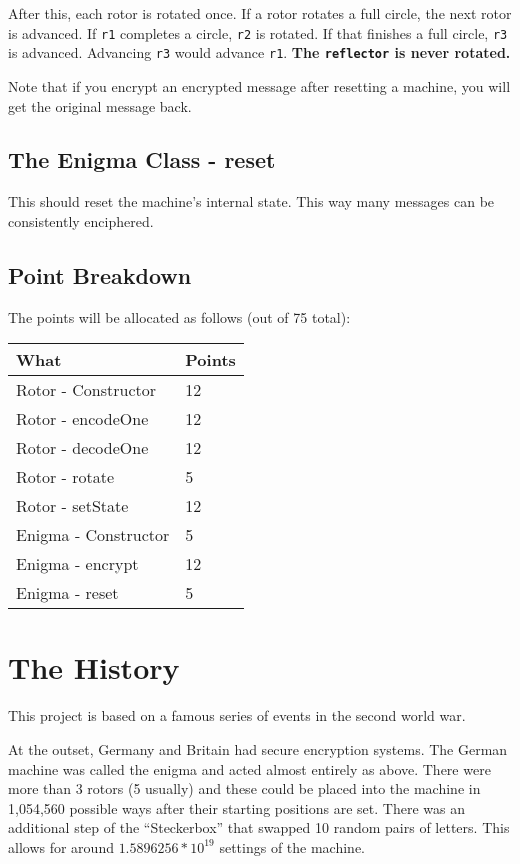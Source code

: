 \documentclass[11pt]{article}
\begin{document}
After this, each rotor is rotated once. If a rotor rotates a full circle, the next rotor is advanced.
If \texttt{r1} completes a circle, \texttt{r2} is rotated. If that finishes a full circle, \texttt{r3} is advanced. Advancing \texttt{r3} would advance \texttt{r1}. \textbf{The \texttt{reflector} is never rotated.}

Note that if you encrypt an encrypted message after resetting a machine, you will get the original message back.

\subsection{The Enigma Class - reset}
This should reset the machine's internal state. This way many messages can be consistently enciphered.

\subsection{Point Breakdown}
The points will be allocated as follows (out of 75 total):
\begin{tabular}{l | l}
  What & Points \\ \hline
  Rotor - Constructor & 12 \\
  Rotor - encodeOne & 12 \\
  Rotor - decodeOne & 12 \\
  Rotor - rotate & 5 \\
  Rotor - setState & 12 \\
  Enigma - Constructor & 5 \\
  Enigma - encrypt & 12 \\
  Enigma - reset & 5 \\
\end{tabular}

\section{The History}
This project is based on a famous series of events in the second world war.

At the outset, Germany and Britain had secure encryption systems.
The German machine was called the enigma and acted almost entirely as above.
There were more than 3 rotors (5 usually) and these could be placed into the machine in
1,054,560 possible ways after their starting positions are set.
There was an additional step of the ``Steckerbox'' that swapped 10 random pairs
of letters.
This allows for around $1.5896256 * 10^{19}$ settings of the machine.
\end{document}
